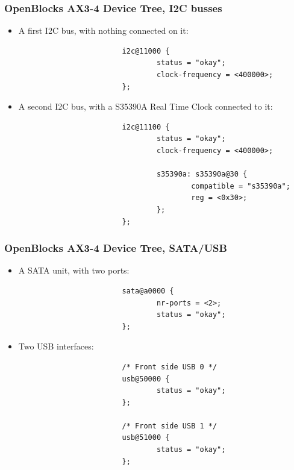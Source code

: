 \begin{frame}[fragile]
  \frametitle{OpenBlocks AX3-4 Device Tree, I2C busses}
  \begin{itemize}
  \item A first I2C bus, with nothing connected on it:
    \begin{block}{}
      \begin{verbatim}
                        i2c@11000 {
                                status = "okay";
                                clock-frequency = <400000>;
                        };
      \end{verbatim}
    \end{block}
  \item A second I2C bus, with a S35390A Real Time Clock connected to
    it:
    \begin{block}{}
      \begin{verbatim}
                        i2c@11100 {
                                status = "okay";
                                clock-frequency = <400000>;

                                s35390a: s35390a@30 {
                                        compatible = "s35390a";
                                        reg = <0x30>;
                                };
                        };
      \end{verbatim}
    \end{block}
  \end{itemize}
\end{frame}

\begin{frame}[fragile]
  \frametitle{OpenBlocks AX3-4 Device Tree, SATA/USB}
  \begin{itemize}
  \item A SATA unit, with two ports:
    \begin{block}{}
      \begin{verbatim}
                        sata@a0000 {
                                nr-ports = <2>;
                                status = "okay";
                        };
      \end{verbatim}
    \end{block}
  \item Two USB interfaces:
    \begin{block}{}
      \begin{verbatim}
                        /* Front side USB 0 */
                        usb@50000 {
                                status = "okay";
                        };

                        /* Front side USB 1 */
                        usb@51000 {
                                status = "okay";
                        };
      \end{verbatim}
    \end{block}
  \end{itemize}
\end{frame}

